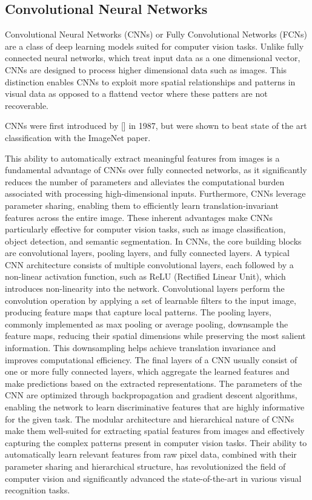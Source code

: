\documentclass[acmtog, authorversion]{acmart}
\begin{document}
\subsection{Convolutional Neural Networks}
Convolutional Neural Networks (CNNs) or Fully Convolutional Networks (FCNs) are a class of deep learning models suited for computer vision tasks. Unlike fully connected neural networks, which treat input data as a one dimensional vector, CNNs are designed to process higher dimensional data such as images.
This distinction enables CNNs to exploit more spatial relationships and patterns in visual data as opposed to a flattend vector where these patters are not recoverable.

CNNs were first introduced by [] in 1987, but were shown to beat state of the art classification with the ImageNet paper.

This ability to automatically extract meaningful features from images is a fundamental advantage of CNNs over fully connected networks, as it significantly reduces the number of parameters and alleviates the computational burden associated with processing high-dimensional inputs. Furthermore, CNNs leverage parameter sharing, enabling them to efficiently learn translation-invariant features across the entire image. These inherent advantages make CNNs particularly effective for computer vision tasks, such as image classification, object detection, and semantic segmentation.
In CNNs, the core building blocks are convolutional layers, pooling layers, and fully connected layers. A typical CNN architecture consists of multiple convolutional layers, each followed by a non-linear activation function, such as ReLU (Rectified Linear Unit), which introduces non-linearity into the network. Convolutional layers perform the convolution operation by applying a set of learnable filters to the input image, producing feature maps that capture local patterns. The pooling layers, commonly implemented as max pooling or average pooling, downsample the feature maps, reducing their spatial dimensions while preserving the most salient information. This downsampling helps achieve translation invariance and improves computational efficiency. The final layers of a CNN usually consist of one or more fully connected layers, which aggregate the learned features and make predictions based on the extracted representations. The parameters of the CNN are optimized through backpropagation and gradient descent algorithms, enabling the network to learn discriminative features that are highly informative for the given task.
The modular architecture and hierarchical nature of CNNs make them well-suited for extracting spatial features from images and effectively capturing the complex patterns present in computer vision tasks. Their ability to automatically learn relevant features from raw pixel data, combined with their parameter sharing and hierarchical structure, has revolutionized the field of computer vision and significantly advanced the state-of-the-art in various visual recognition tasks.
\end{document}
